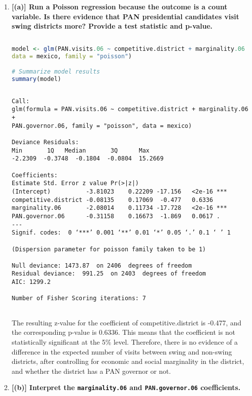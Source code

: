 \documentclass[12pt,letterpaper]{article}
\begin{document}
\begin{enumerate}
	\item \textbf{[(a)]
	Run a Poisson regression because the outcome is a count variable. Is there evidence that PAN presidential candidates visit swing districts more? Provide a test statistic and p-value.}

	\begin{lstlisting}[language=R]
	
model <- glm(PAN.visits.06 ~ competitive.district + marginality.06 + PAN.governor.06,
data = mexico, family = "poisson")

# Summarize model results
summary(model)
	
\end{lstlisting}


\begin{verbatim}
Call:
glm(formula = PAN.visits.06 ~ competitive.district + marginality.06 + 
PAN.governor.06, family = "poisson", data = mexico)

Deviance Residuals: 
Min       1Q   Median       3Q      Max  
-2.2309  -0.3748  -0.1804  -0.0804  15.2669  

Coefficients:
Estimate Std. Error z value Pr(>|z|)    
(Intercept)          -3.81023    0.22209 -17.156   <2e-16 ***
competitive.district -0.08135    0.17069  -0.477   0.6336    
marginality.06       -2.08014    0.11734 -17.728   <2e-16 ***
PAN.governor.06      -0.31158    0.16673  -1.869   0.0617 .  
---
Signif. codes:  0 ‘***’ 0.001 ‘**’ 0.01 ‘*’ 0.05 ‘.’ 0.1 ‘ ’ 1

(Dispersion parameter for poisson family taken to be 1)

Null deviance: 1473.87  on 2406  degrees of freedom
Residual deviance:  991.25  on 2403  degrees of freedom
AIC: 1299.2

Number of Fisher Scoring iterations: 7
	
\end{verbatim}

\noindent The resulting z-value for the coefficient of competitive.district is -0.477, and the corresponding p-value is 0.6336. This means that the coefficient is not statistically significant at the 5\% level. Therefore, there is no evidence of a difference in the expected number of visits between swing and non-swing districts, after controlling for economic and social marginality in the district, and whether the district has a PAN governor or not.

	\item \textbf{[(b)]
	Interpret the \texttt{marginality.06} and \texttt{PAN.governor.06} coefficients.}


\end{enumerate}
\end{document}
